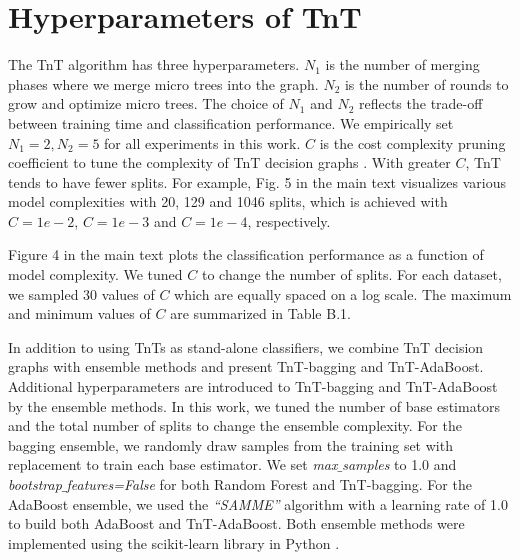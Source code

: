 \documentclass{article}
\begin{document}
\section{Hyperparameters of TnT}
The TnT algorithm has three hyperparameters. $N_1$ is the number of merging phases where we merge micro trees into the graph. $N_2$ is the number of rounds to grow and optimize micro trees. The choice of $N_1$ and $N_2$ reflects the trade-off between training time and classification performance. We empirically set $N_1=2, N_2=5$ for all experiments in this work. $C$ is the cost complexity pruning coefficient to tune the complexity of TnT decision graphs \cite{bradford1998pruning, kiran2017cost}. With greater $C$, TnT tends to have fewer splits. For example, Fig. 5 in the main text visualizes various model complexities with 20, 129 and 1046 splits, which is achieved with $C=1e-2$, $C=1e-3$ and $C=1e-4$, respectively. %

Figure 4 in the main text plots the classification performance as a function of model complexity. We tuned $C$ to change the number of splits. For each dataset, we sampled 30 values of $C$ which are equally spaced on a log scale. The maximum and minimum values of $C$ are summarized in Table B.1.
\begin{table}[h]
    \centering
    \caption{The maximum and minimum values of $C$ on different datasets.}
\end{table}

In addition to using TnTs as stand-alone classifiers, we combine TnT decision graphs with ensemble methods and present TnT-bagging and TnT-AdaBoost. Additional hyperparameters are introduced to TnT-bagging and TnT-AdaBoost by the ensemble methods. In this work, we tuned the number of base estimators and the total number of splits to change the ensemble complexity. For the bagging ensemble, we randomly draw samples from the training set with replacement to train each base estimator. We set \textit{max$\_$samples} to 1.0 and \textit{bootstrap$\_$features=False} for both Random Forest and TnT-bagging. For the AdaBoost ensemble, we used the \textit{``SAMME''} algorithm with a learning rate of 1.0 to build both AdaBoost and TnT-AdaBoost. Both ensemble methods were implemented using the scikit-learn library in Python \cite{scikit-learn}.
\end{document}
